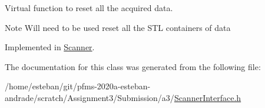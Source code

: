 Virtual function to reset all the acquired data. 

\begin{DoxyNote}{Note}
Will need to be used reset all the S\+TL containers of data 
\end{DoxyNote}


Implemented in \hyperlink{classScanner_a95dea82a0db3f7ca8cf5152c85f89239}{Scanner}.



The documentation for this class was generated from the following file\+:\begin{DoxyCompactItemize}
\item 
/home/esteban/git/pfms-\/2020a-\/esteban-\/andrade/scratch/\+Assignment3/\+Submission/a3/\hyperlink{ScannerInterface_8h}{Scanner\+Interface.\+h}\end{DoxyCompactItemize}
